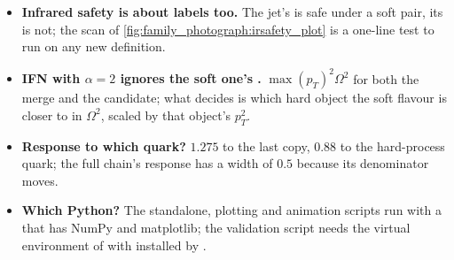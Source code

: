 \begin{pitfalls}
\begin{itemize}[nosep]
    then reads three B~hadrons.
  \item \textbf{Infrared safety is about labels too.} The jet's \pt is
    safe under a soft pair, its \hadflav is not; the scan of
    \cref{fig:family_photograph:irsafety_plot} is a one-line test to run
    on any new definition.
  \item \textbf{IFN with $\alpha=2$ ignores the soft one's \pt.}
    $\max(p_T)^2\Omega^2$ for both the merge and the candidate; what
    decides is which hard object the soft flavour is closer to in
    $\Omega^2$, scaled by that object's $p_T^2$.
  \item \textbf{Response to which quark?} $1.275$ to the last copy,
    $0.88$ to the hard-process quark; the full chain's response has a
    width of $0.5$ because its denominator moves.
  \item \textbf{Which Python?} The standalone, plotting and animation
    scripts run with a  that has NumPy and matplotlib; the
    validation script needs the virtual environment of
     with \FASTJET installed by .
\end{itemize}
\end{pitfalls}

